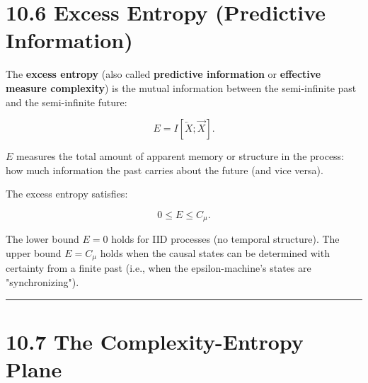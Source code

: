 \section{10.6 Excess Entropy (Predictive Information)}

\begin{definition}
The \textbf{excess entropy} (also called \textbf{predictive information} or \textbf{effective measure complexity}) is the mutual information between the semi-infinite past and the semi-infinite future:

\[
E = I[\overleftarrow{X}; \overrightarrow{X}].
\]

$E$ measures the total amount of apparent memory or structure in the process: how much information the past carries about the future (and vice versa).
\end{definition}


\begin{proposition}[Bounds]
The excess entropy satisfies:

\[
0 \leq E \leq C_\mu.
\]

The lower bound $E = 0$ holds for IID processes (no temporal structure). The upper bound $E = C_\mu$ holds when the causal states can be determined with certainty from a finite past (i.e., when the epsilon-machine's states are "synchronizing").

\bigskip\hrule\bigskip
\end{proposition}

\section{10.7 The Complexity-Entropy Plane}

